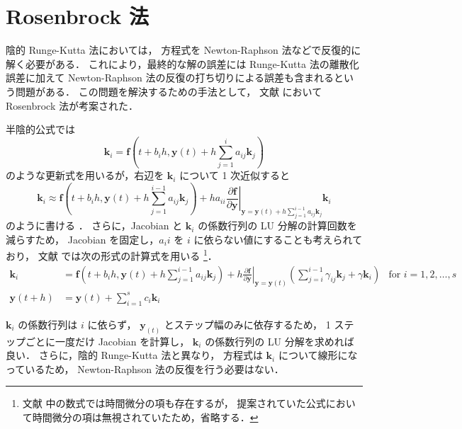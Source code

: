 \section{Rosenbrock 法}

陰的 Runge-Kutta 法においては，
方程式を Newton-Raphson 法などで反復的に解く必要がある．
これにより，最終的な解の誤差には Runge-Kutta 法の離散化誤差に加えて
Newton-Raphson 法の反復の打ち切りによる誤差も含まれるという問題がある．
この問題を解決するための手法として，
文献 \cite{Rosenbrock1963} において Rosenbrock 法が考案された．

半陰的公式では
\begin{equation}
    \bm{k}_i = \bm{f}\left(t + b_i h, \bm{y}(t) + h \sum_{j = 1}^i a_{ij} \bm{k}_j \right)
\end{equation}
のような更新式を用いるが，右辺を $\bm{k}_i$ について 1 次近似すると
\begin{equation}
    \bm{k}_i \approx \bm{f}\left(t + b_i h, \bm{y}(t) + h \sum_{j = 1}^{i-1} a_{ij} \bm{k}_j \right)
    + h a_{ii}
    \left. \frac{\partial \bm{f}}{\partial \bm{y}}
    \right|_{\bm{y} = \bm{y}(t) + h \sum_{j = 1}^{i-1} a_{ij} \bm{k}_j}
    \bm{k}_i
\end{equation}
のように書ける \cite{Rosenbrock1963}．
さらに，Jacobian と $\bm{k}_i$ の係数行列の LU 分解の計算回数を減らすため，
Jacobian を固定し，$a_ii$ を $i$ に依らない値にすることも考えられており，
文献 \cite{Rang2005} では次の形式の計算式を用いる
\footnote{文献 \cite{Rang2005} 中の数式では時間微分の項も存在するが，%
    提案されていた公式において時間微分の項は無視されていたため，省略する．}．
\begin{align}
    \bm{k}_i
     & = \bm{f}\left(t + b_i h, \bm{y}(t) + h \sum_{j = 1}^{i - 1} a_{ij} \bm{k}_j \right)
    + h
    \left. \frac{\partial \bm{f}}{\partial \bm{y}} \right|_{\bm{y} = \bm{y}(t)}
    \left( \sum_{j = i}^{i - 1} \gamma_{ij} \bm{k}_j + \gamma \bm{k}_i \right)
     & \text{for $i = 1, 2, \ldots, s$}
    \label{eq:ode_rosenbrock_k-law}                                                        \\
    \bm{y}(t + h)
     & = \bm{y}(t) + \sum_{i=1}^{s} c_i \bm{k}_i
    \label{eq:ode_rosenbrock_y-law}
\end{align}

$\bm{k}_i$ の係数行列は $i$ に依らず，
$\bm{y}_(t)$ とステップ幅のみに依存するため，
1 ステップごとに一度だけ Jacobian を計算し，
$\bm{k}_i$ の係数行列の LU 分解を求めれば良い．
さらに，陰的 Runge-Kutta 法と異なり，
方程式は $\bm{k}_i$ について線形になっているため，
Newton-Raphson 法の反復を行う必要はない．

